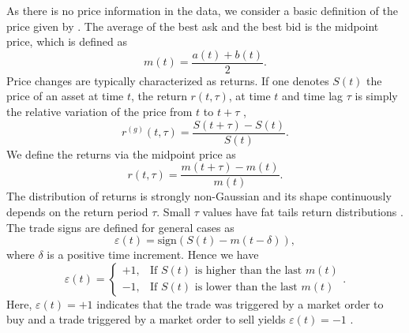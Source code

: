 As there is no price information in the data, we consider a basic definition of
the price given by \cite{patterns_forex,political_forex,forex_liquidity}. The
average of the best ask and the best bid is the midpoint price, which is
defined as
\cite{subtle_nature,Bouchaud_2004,teach_spread,large_prices_changes,my_paper_response_financial,em_stylized_facts,prop_order_book,stat_theory}
\begin{equation}
    m \left(t\right) = \frac{a\left(t\right) + b\left(t\right)}{2}.
\end{equation}
Price changes are typically characterized as returns. If one denotes
$S\left( t\right)$ the price of an asset at time $t$, the return
$r\left(t, \tau\right)$, at time $t$ and time lag $\tau$ is simply the relative
variation of the price from $t$ to $t + \tau$
\cite{subtle_nature,empirical_facts,asynchrony_effects_corr,tick_size_impact,causes_epps_effect,non_stationarity},
\begin{equation}\label{eq:return_general}
    r^{\left(g\right)} \left(t, \tau \right) = \frac{S\left(t + \tau\right)
    - S\left(t\right)}{S\left(t\right)}.
\end{equation}
We define the returns via the midpoint price as
\begin{equation}\label{eq:midpoint_price_return}
    r\left(t,\tau\right) = \frac{m\left(t+\tau\right)-m\left(t\right)}
    {m\left(t\right)}.
\end{equation}
The distribution of returns is strongly non-Gaussian and its shape continuously
depends on the return period $\tau$. Small $\tau$ values have fat tails return
distributions \cite{subtle_nature}. The trade signs are defined for general
cases as
\begin{equation}\label{eq:trade_sign_general}
    \varepsilon\left(t\right)=\text{sign}\left(S\left(t\right)
    -m\left(t-\delta\right)\right),
\end{equation}
where $\delta$ is a positive time increment. Hence we have
\begin{equation}\label{eq:trade_sign_results}
    \varepsilon\left(t\right)=\left\{
    \begin{array}{cc}
    +1, & \text{If } S\left(t\right)
    \text{ is higher than the last } m\left( t \right)\\
    -1, & \text{If } S\left(t\right)
    \text{ is lower than the last } m\left( t \right)
    \end{array}\right. .
\end{equation}
Here, $\varepsilon(t) = +1$ indicates that the trade was triggered by a market
order to buy and a trade triggered by a market order to sell yields
$\varepsilon(t) = -1$
\cite{subtle_nature,Bouchaud_2004,spread_changes_affect,quant_stock_price_response,order_flow_persistent}.

